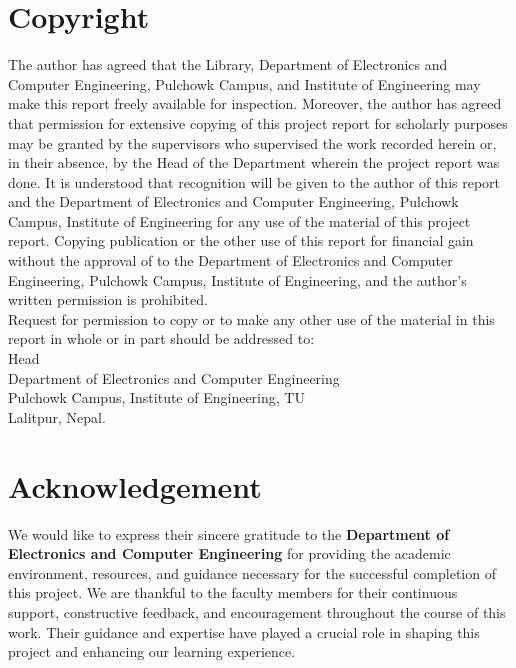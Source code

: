\documentclass[12pt,a4paper]{article}
\begin{document}
\newpage
\section*{Copyright}
The author has agreed that the Library, Department of Electronics and Computer Engineering, Pulchowk Campus, and Institute of Engineering may make this report freely available for inspection. Moreover, the author has agreed that permission for extensive copying of this project report for scholarly purposes may be granted by the supervisors who supervised the work recorded herein or, in their absence, by the Head of the Department wherein the project report was done. It is understood that recognition will be given to the author of this report and the Department of Electronics and Computer Engineering, Pulchowk Campus, Institute of Engineering for any use of the material of this project report. Copying publication or the other use of this report for financial gain without the approval of to the Department of Electronics and Computer Engineering, Pulchowk Campus, Institute of Engineering, and the author's written permission is prohibited.\\
Request for permission to copy or to make any other use of the material in this report in whole or in part should be addressed to:\\

\vspace{1.5cm}
Head\\
Department of Electronics and Computer Engineering\\
Pulchowk Campus, Institute of Engineering, TU\\
Lalitpur, Nepal.


\newpage
\section*{Acknowledgement}

We would like to express their sincere gratitude to the \textbf{Department of Electronics and Computer Engineering} for providing the academic environment, resources, and guidance necessary for the successful completion of this project. We are thankful to the faculty members for their continuous support, constructive feedback, and encouragement throughout the course of this work. Their guidance and expertise have played a crucial role in shaping this project and enhancing our learning experience.
\clearpage
\end{document}

